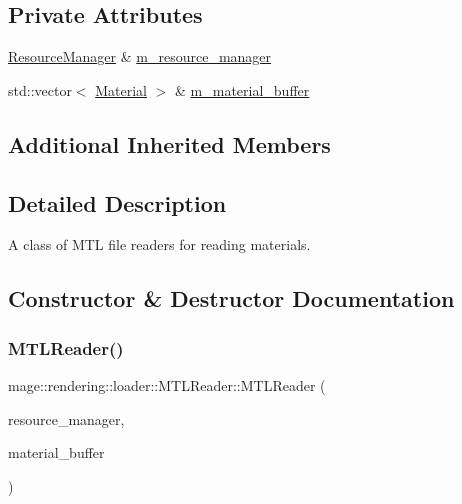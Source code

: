 \subsection*{Private Attributes}
\begin{DoxyCompactItemize}
\item 
\mbox{\hyperlink{classmage_1_1rendering_1_1_resource_manager}{Resource\+Manager}} \& \mbox{\hyperlink{classmage_1_1rendering_1_1loader_1_1_m_t_l_reader_aa227ae7e44df08b1973171ff165eadb8}{m\+\_\+resource\+\_\+manager}}
\item 
std\+::vector$<$ \mbox{\hyperlink{classmage_1_1rendering_1_1_material}{Material}} $>$ \& \mbox{\hyperlink{classmage_1_1rendering_1_1loader_1_1_m_t_l_reader_ae2fef19220c95fa5593fb43ea86c7293}{m\+\_\+material\+\_\+buffer}}
\end{DoxyCompactItemize}
\subsection*{Additional Inherited Members}


\subsection{Detailed Description}
A class of M\+TL file readers for reading materials. 

\subsection{Constructor \& Destructor Documentation}
\mbox{\label{classmage_1_1rendering_1_1loader_1_1_m_t_l_reader_a3615f6899de22b53de1bad257ac34099}} 
\subsubsection{\texorpdfstring{M\+T\+L\+Reader()}{MTLReader()}\hspace{0.1cm}{\footnotesize\ttfamily [1/3]}}
{\footnotesize\ttfamily mage\+::rendering\+::loader\+::\+M\+T\+L\+Reader\+::\+M\+T\+L\+Reader (\begin{DoxyParamCaption}\item[{\mbox{\hyperlink{classmage_1_1rendering_1_1_resource_manager}{Resource\+Manager}} \&}]{resource\+\_\+manager,  }\item[{std\+::vector$<$ \mbox{\hyperlink{classmage_1_1rendering_1_1_material}{Material}} $>$ \&}]{material\+\_\+buffer }\end{DoxyParamCaption})\hspace{0.3cm}{\ttfamily [explicit]}}

